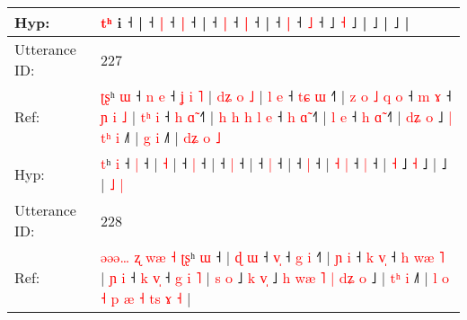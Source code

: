 \documentclass[10pt]{article}
\DeclareRobustCommand{\hl}[1]{{\textcolor{red}{#1}}}
\begin{document}
\begin{longtable}{ll}
 \\
Hyp: & \hl{}\hl{}\hl{}\hl{t}\hl{ʰ} i ˧\hl{}\hl{}\hl{}\hl{}\hl{}\hl{}\hl{}\hl{}\hl{}\hl{}\hl{}\hl{}\hl{}\hl{}\hl{}\hl{}\hl{}\hl{}\hl{}\hl{}\hl{}\hl{}\hl{}\hl{}\hl{}\hl{} |\hl{}\hl{}\hl{}\hl{}\hl{} ˧\hl{}\hl{} \hl{|} ˧\hl{}\hl{} \hl{|} ˧\hl{} |\hl{}\hl{}\hl{}\hl{}\hl{}\hl{}\hl{}\hl{}\hl{}\hl{} ˧\hl{}\hl{}\hl{}\hl{} \hl{}\hl{|} ˧\hl{}\hl{} \hl{|} ˧\hl{} |\hl{}\hl{}\hl{}\hl{} ˧\hl{}\hl{} \hl{|} ˧\hl{}\hl{}\hl{} \hl{˩} ˧\hl{}\hl{}\hl{}\hl{}\hl{}\hl{}\hl{}\hl{}\hl{}\hl{} ˩ \hl{}\hl{˧} ˩ |\hl{}\hl{}\hl{}\hl{}\hl{}\hl{}\hl{}\hl{}\hl{}\hl{}\hl{}\hl{}\hl{}\hl{}\hl{}\hl{}\hl{}\hl{}\hl{}\hl{}\hl{}\hl{} ˩ |\hl{}\hl{}\hl{}\hl{}\hl{}\hl{}\hl{}\hl{} ˩ |
 \\
\midrule
Utterance ID: & 227 \\
Ref: & \hl{ʈ}\hl{ʂ}ʰ \hl{ɯ} ˧\hl{ }\hl{n} \hl{e} ˧\hl{ }\hl{ʝ}\hl{ }\hl{i}\hl{ }\hl{˥} |\hl{ }\hl{d}\hl{ʑ}\hl{ }\hl{o} \hl{˩} |\hl{ }\hl{l}\hl{ }\hl{e} ˧\hl{ }\hl{t}\hl{ɕ} \hl{ɯ} ˧\hl{˥} |\hl{ }\hl{z}\hl{ }\hl{o}\hl{ }\hl{˩}\hl{ }\hl{q}\hl{ }\hl{o} ˧\hl{ }\hl{m} \hl{ɤ} ˧\hl{ }\hl{ɲ}\hl{ }\hl{i}\hl{ }\hl{˩} |\hl{ }\hl{t}\hl{ʰ}\hl{ }\hl{i} ˧\hl{ }\hl{h} \hl{ɑ}\hl{̃} ˧\hl{˥} |\hl{ }\hl{h}\hl{ }\hl{h}\hl{ }\hl{h}\hl{ }\hl{l}\hl{ }\hl{e} ˧\hl{ }\hl{h} \hl{ɑ}\hl{̃} ˧\hl{˥} | \hl{l} \hl{e} ˧\hl{ }\hl{h} \hl{ɑ}\hl{̃} ˧\hl{˥} |\hl{ }\hl{d}\hl{ʑ} \hl{o} ˩\hl{ }\hl{|}\hl{ }\hl{t}\hl{ʰ} \hl{i} ˩\hl{˥} |\hl{ }\hl{g}\hl{ }\hl{i} ˩\hl{˥} |\hl{ }\hl{d}\hl{ʑ} \hl{o} \hl{˩}
 \\
Hyp: & \hl{}\hl{t}ʰ \hl{i} ˧\hl{}\hl{} \hl{|} ˧\hl{}\hl{}\hl{}\hl{}\hl{}\hl{} |\hl{}\hl{}\hl{}\hl{}\hl{} \hl{˧} |\hl{}\hl{}\hl{}\hl{} ˧\hl{}\hl{}\hl{} \hl{|} ˧\hl{} |\hl{}\hl{}\hl{}\hl{}\hl{}\hl{}\hl{}\hl{}\hl{}\hl{} ˧\hl{}\hl{} \hl{|} ˧\hl{}\hl{}\hl{}\hl{}\hl{}\hl{} |\hl{}\hl{}\hl{}\hl{}\hl{} ˧\hl{}\hl{} \hl{}\hl{|} ˧\hl{} |\hl{}\hl{}\hl{}\hl{}\hl{}\hl{}\hl{}\hl{}\hl{}\hl{} ˧\hl{}\hl{} \hl{}\hl{|} ˧\hl{} | \hl{˧} \hl{|} ˧\hl{}\hl{} \hl{}\hl{|} ˧\hl{} |\hl{}\hl{}\hl{} \hl{˧} ˩\hl{}\hl{}\hl{}\hl{}\hl{} \hl{˧} ˩\hl{} |\hl{}\hl{}\hl{}\hl{} ˩\hl{} |\hl{}\hl{}\hl{} \hl{˩} \hl{|}
 \\
\midrule
Utterance ID: & 228 \\
Ref: & \hl{ə}\hl{ə}\hl{ə}\hl{…}\hl{ }\hl{ʐ}\hl{ }\hl{w}\hl{æ}\hl{ }\hl{˧}\hl{ }\hl{ʈ}\hl{ʂ}ʰ \hl{ɯ} ˧ | \hl{ɖ} \hl{ɯ} ˧ \hl{v}\hl{̩} ˧\hl{ }\hl{g} \hl{i} ˧\hl{˥} | \hl{ɲ} \hl{i} ˧\hl{ }\hl{k} \hl{v}\hl{̩} ˧\hl{ }\hl{h} \hl{w}\hl{æ} \hl{˥} | \hl{ɲ} \hl{i} ˧\hl{ }\hl{k} \hl{v}\hl{̩} ˧\hl{ }\hl{g} \hl{i} \hl{˥} |\hl{ }\hl{s} \hl{o} ˩\hl{ }\hl{k} \hl{v}\hl{̩} ˩\hl{ }\hl{h}\hl{ }\hl{w}\hl{æ}\hl{ }\hl{˥}\hl{ }\hl{|}\hl{ }\hl{d}\hl{ʑ} \hl{o} ˩ |\hl{ }\hl{t}\hl{ʰ}\hl{ }\hl{i} ˩\hl{˥} |\hl{ }\hl{l}\hl{ }\hl{o}\hl{ }\hl{˧}\hl{ }\hl{p}\hl{ }\hl{æ}\hl{ }\hl{˧}\hl{ }\hl{t}\hl{s}\hl{ }\hl{ɤ} \hl{˧} |

\end{longtable}
\end{document}

